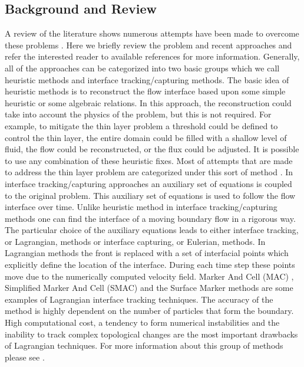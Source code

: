 \documentclass[review]{elsarticle}
\begin{document}
\subsection{Background and Review}
A review of the literature shows numerous attempts have been made to overcome these problems \cite{Medeiros2013,Balzano1998,Aureli2008,Bunya2009,Casulli2009,
Kesserwani2011,DAlpaos2007,Castro2005}.
Here we briefly review the problem and recent approaches and refer the interested reader to available references for more information.
Generally, all of the approaches can be 
categorized into two basic groups which we call heuristic methods and interface tracking/capturing methods.
The basic idea of heuristic methods is to reconstruct the flow interface based upon 
some simple heuristic or some algebraic relations. In this approach, the reconstruction could take into account the physics of the problem, but this is not required. 
For example, to mitigate the thin layer problem a threshold could be defined to control the thin layer, the entire domain could be filled with a shallow level of fluid,
the flow could be reconstructed, or the flux could be adjusted. It is possible to use any combination of these heuristic fixes.
Most of attempts that are made to address the thin layer problem are categorized under this sort of method \cite{Aureli2008,Bunya2009,Castro2005,Kesserwani2011}.
In interface tracking/capturing approaches
an auxiliary set of equations is coupled to the original problem. This auxiliary set of equations is used to follow the flow interface over time. 
Unlike heuristic method in interface tracking/capturing methods one can find the interface of a moving boundary flow in a rigorous way. 
The particular choice of the auxiliary equations leads to either interface tracking, or Lagrangian, methods or interface capturing, or Eulerian, methods.
In Lagrangian methods the front is replaced with a set of interfacial points which explicitly define the location of the interface.
During each time step these points move due to the numerically computed velocity field.
Marker And Cell (MAC) \cite{Harlow1965}, Simplified Marker And Cell (SMAC) \cite{Cheng1995} and the Surface Marker \citep{Wrobel1991} methods are some examples of Lagrangian interface tracking techniques.
The accuracy of the method is highly dependent on the number of particles that form the boundary.
High computational cost, a tendency to form numerical instabilities and the inability to track complex topological changes are the most important drawbacks of Lagrangian techniques.
For more information about this group of methods please see \cite{Glimm1995,Unverdi1992,Osher1988,Anderson1998,hirt1981vfv}.
\end{document}
